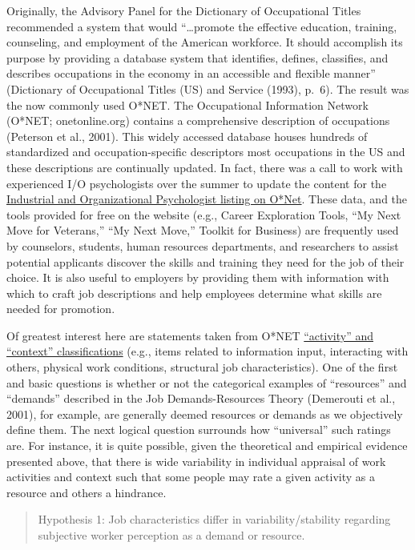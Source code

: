 \documentclass[
  english,
  man]{apa6}
\begin{document}
Originally, the Advisory Panel for the Dictionary of Occupational Titles recommended a system that would ``\ldots promote the effective education, training, counseling, and employment of the American workforce. It should accomplish its purpose by providing a database system that identifies, defines, classifies, and describes occupations in the economy in an accessible and flexible manner'' (Dictionary of Occupational Titles (US) and Service (1993), p.~6). The result was the now commonly used O*NET. The Occupational Information Network (O*NET; onetonline.org) contains a comprehensive description of occupations (Peterson et al., 2001). This widely accessed database houses hundreds of standardized and occupation-specific descriptors most occupations in the US and these descriptions are continually updated. In fact, there was a call to work with experienced I/O psychologists over the summer to update the content for the \href{https://www.onetonline.org/link/summary/19-3032.00}{Industrial and Organizational Psychologist listing on O*Net}. These data, and the tools provided for free on the website (e.g., Career Exploration Tools, ``My Next Move for Veterans,'' ``My Next Move,'' Toolkit for Business) are frequently used by counselors, students, human resources departments, and researchers to assist potential applicants discover the skills and training they need for the job of their choice. It is also useful to employers by providing them with information with which to craft job descriptions and help employees determine what skills are needed for promotion.

Of greatest interest here are statements taken from O*NET \href{https://www.O*NETonline.org/find/descriptor/result/4.A.1.b.3}{``activity'' and ``context'' classifications} (e.g., items related to information input, interacting with others, physical work conditions, structural job characteristics). One of the first and basic questions is whether or not the categorical examples of ``resources'' and ``demands'' described in the Job Demands-Resources Theory (Demerouti et al., 2001), for example, are generally deemed resources or demands as we objectively define them. The next logical question surrounds how ``universal'' such ratings are. For instance, it is quite possible, given the theoretical and empirical evidence presented above, that there is wide variability in individual appraisal of work activities and context such that some people may rate a given activity as a resource and others a hindrance.

\begin{quote}
Hypothesis 1: Job characteristics differ in variability/stability regarding subjective worker perception as a demand or resource.
\end{quote}
\end{document}
